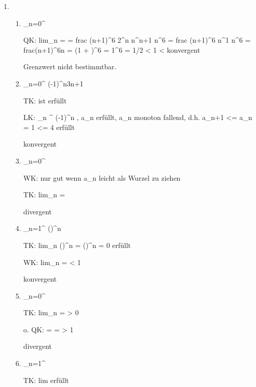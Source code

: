 \begin{enumerate}
\item 
\begin{enumerate}
\item \Sigma_{n=0}^{\infty} 

QK: lim_{n \rightarow \infty}  =  = frac{ (n+1)^6 2^n }{ n^{n+1} n^6 } =  frac{ (n+1)^6 }{ n^{1} n^6 } = frac{(n+1)^6}{n}  = (1 + )^6  = 1^6  = 1/2 < 1 < \infty \Rightarrow konvergent

Grenzwert nicht bestimmtbar.

\item \Sigma_{n=0}^{\infty} {(-1)^n}{3n+1}

TK: ist erfüllt

LK: \Sigma_{n }^{\infty} (-1)^n  , a_n  \Rightarrow erfüllt, a_n monoton fallend, d.h. a_{n+1} <= a_n = 1 <= 4 \Righarrow erfüllt

\Rightarrow konvergent

\item \Sigma_{n=0}^{\infty} 

WK: nur gut wenn a_n leicht als Wurzel zu ziehen

TK: lim_{n \rightarrow \infty}  \lightning = \infty

\Rightarrow divergent

\item \Sigma_{n=1}^{\infty} ()^n

TK: lim_{n } ()^n = ()^n = 0 \Rightarrow erfüllt

WK: lim_{n \rightarrow \oinfty}  =  < 1

\Rightarrow konvergent

\item \Sigma_{n=0}^{\infty} 

TK: lim_{n }  = \infty > 0 

o. QK: =  =  > 1

\Rightarrow divergent

\item \Sigma_{n=1}^{\infty} 

TK: lim   \Rightarrow erfüllt


\end{enumerate}
\end{enumerate}
